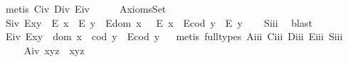 \begin{isabellebody}
\ {\isacharparenleft}metis\ C\isactrlsub i\isactrlsub v\ D\isactrlsub i\isactrlsub v\ E\isactrlsub i\isactrlsub v{\isacharparenright}%
\endisatagproof
{\isafoldproof}%
%
\isadelimproof
%
\endisadelimproof
\isanewline
\ \ \isamarkupfalse%
%
\isamarkuptrue%
\ \isamarkupfalse%
\ AxiomsSet{}\isanewline
\ \ \isanewline
\ \ \ \isamarkupfalse%
\ S\isactrlsub i\isactrlsub v{\isacharcolon}\ {\isachardoublequoteopen}{\isacharparenleft}E{\isacharparenleft}x{\isasymcdot}y{\isacharparenright}\ \isactrlbold {\isasymrightarrow}\ {\isacharparenleft}E\ x\ \isactrlbold {\isasymand}\ E\ y{\isacharparenright}{\isacharparenright}\ \isactrlbold {\isasymand}\ {\isacharparenleft}E{\isacharparenleft}dom\ x\ {\isacharparenright}\ \isactrlbold {\isasymrightarrow}\ E\ x{\isacharparenright}\ \isactrlbold {\isasymand}\ {\isacharparenleft}E{\isacharparenleft}cod\ y{\isacharparenright}\ \isactrlbold {\isasymrightarrow}\ E\ y{\isacharparenright}{\isachardoublequoteclose}%
\isadelimproof
\ \ %
\endisadelimproof
%
\isatagproof
{}\isamarkupfalse%
\ S\isactrlsub i\isactrlsub i\isactrlsub i\ \isamarkupfalse%
\ blast%
\endisatagproof
{\isafoldproof}%
%
\isadelimproof
%
\endisadelimproof
\isanewline
\ \ \ \isamarkupfalse%
\ E\isactrlsub i\isactrlsub v{\isacharcolon}\ {\isachardoublequoteopen}E{\isacharparenleft}x{\isasymcdot}y{\isacharparenright}\ \isactrlbold {\isasymleftrightarrow}\ {\isacharparenleft}dom\ x\ {\isasymcong}\ cod\ y\ \isactrlbold {\isasymand}\ E{\isacharparenleft}cod\ y{\isacharparenright}{\isacharparenright}{\isachardoublequoteclose}%
\isadelimproof
\ %
\endisadelimproof
%
\isatagproof
{}\isamarkupfalse%
\ {\isacharparenleft}metis\ {\isacharparenleft}full{\isacharunderscore}types{\isacharparenright}\ A\isactrlsub i\isactrlsub i\isactrlsub i\ C\isactrlsub i\isactrlsub i\isactrlsub i\ D\isactrlsub i\isactrlsub i\isactrlsub i\ E\isactrlsub i\isactrlsub i\isactrlsub i\ S\isactrlsub i\isactrlsub i\isactrlsub i{\isacharparenright}%
\endisatagproof
{\isafoldproof}%
%
\isadelimproof
%
\endisadelimproof
\isanewline
\ \ \ \isamarkupfalse%
\ A\isactrlsub i\isactrlsub v{\isacharcolon}\ {\isachardoublequoteopen}x{\isasymcdot}{\isacharparenleft}y{\isasymcdot}z{\isacharparenright}\ {\isasymcong}\ {\isacharparenleft}x{\isasymcdot}y{\isacharparenright}{\isasymcdot}z{\isachardoublequoteclose}%
\isadelimproof
\ %
\endisadelimproof
%
\isatagproof
{}\isamarkupfalse%

\end{isabellebody}
